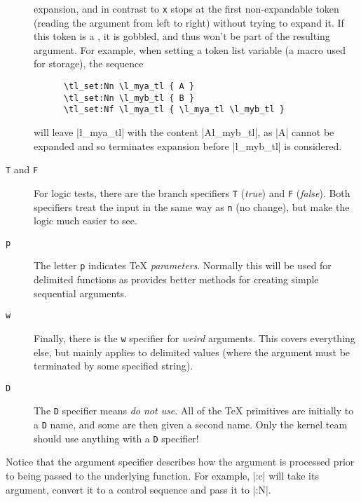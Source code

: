 \documentclass[dvipdfmx,full,kernel]{wtpl3doc}
\begin{document}
\begin{description}
{    expansion}, and in contrast to \texttt{x} stops at the first
    non-expandable token (reading the argument from left to right) without
    trying to expand it. If this token is a , it is gobbled,
    and thus won't be part of the resulting argument. For example, when
    setting a token list variable (a macro used for storage), the sequence
    \begin{verbatim}
      \tl_set:Nn \l_mya_tl { A }
      \tl_set:Nn \l_myb_tl { B }
      \tl_set:Nf \l_mya_tl { \l_mya_tl \l_myb_tl }
    \end{verbatim}
    will leave |\l_mya_tl| with the content |A\l_myb_tl|, as |A| cannot
    be expanded and so terminates expansion before |\l_myb_tl| is considered.
  \item[\texttt{T} and \texttt{F}] For logic tests, there are the branch
    specifiers \texttt{T} (\emph{true}) and \texttt{F} (\emph{false}).
    Both specifiers treat the input in the same way as \texttt{n} (no
    change), but make the logic much easier to see.
  \item[\texttt{p}] The letter \texttt{p} indicates \TeX{}
    \emph{parameters}. Normally this will be used for delimited
    functions as  provides better methods for creating simple
    sequential arguments.
  \item[\texttt{w}] Finally, there is the \texttt{w} specifier for
    \emph{weird} arguments. This covers everything else, but mainly
    applies to delimited values (where the argument must be terminated
    by some specified string).
  \item[\texttt{D}] The \texttt{D} specifier means \emph{do not use}.
    All of the \TeX{} primitives are initially  to a \texttt{D}
    name, and some are then given a second name.  Only the kernel
    team should use anything with a \texttt{D} specifier!
\end{description}
Notice that the argument specifier describes how the argument is
processed prior to being passed to the underlying function. For example,
|\foo:c| will take its argument, convert it to a control sequence and
pass it to |\foo:N|.
\end{document}

